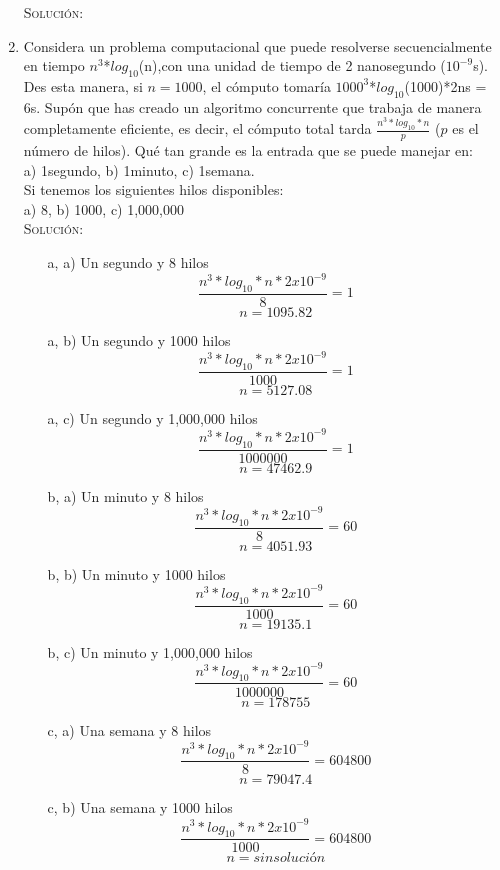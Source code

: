 \documentclass[letterpaper,10pt]{article}
\begin{document}
\begin{enumerate}
    \textsc{Solución:}
         \\
    
    \item Considera un problema computacional que puede resolverse secuencialmente en tiempo $n^3$*$log_{10}$(n),con una unidad de tiempo de 2 nanosegundo ($10^{-9}$s). Des esta manera, si $n = 1000$, el cómputo tomaría $1000^{3}$*$log_{10}$(1000)*2ns = 6s. Supón que has creado un algoritmo concurrente que trabaja de manera completamente eficiente, es decir, el cómputo total tarda $\frac{n^3*log_{10}*n}{p}$ ($p$ es el número de hilos). Qué tan grande es la entrada que se puede manejar en:\\
    a) 1segundo, b) 1minuto, c) 1semana.\\
    Si tenemos los siguientes hilos disponibles:\\
    a) 8, b) 1000, c) 1,000,000\\

    \textsc{Solución:}
	\\
	\begin{itemize}
	
	\item[a, a) ] Un segundo y 8 hilos\\
	$$\frac{n^3*log_{10}*n*2x10^{-9}}{8}=1$$
	$$n = 1095.82$$
	
	\item[a, b) ] Un segundo y 1000 hilos
	$$\frac{n^3*log_{10}*n*2x10^{-9}}{1000}=1$$
	$$n = 5127.08$$
	
	\item[a, c) ] Un segundo y 1,000,000 hilos
	$$\frac{n^3*log_{10}*n*2x10^{-9}}{1000000}=1$$
	$$n = 47462.9$$
	
	\item[b, a) ] Un minuto y 8 hilos
	$$\frac{n^3*log_{10}*n*2x10^{-9}}{8}=60$$
	$$n = 4051.93$$
	
	\item[b, b) ] Un minuto y 1000 hilos
	$$\frac{n^3*log_{10}*n*2x10^{-9}}{1000}=60$$
	$$n = 19135.1$$
	
	\item[b, c) ] Un minuto y 1,000,000 hilos
	$$\frac{n^3*log_{10}*n*2x10^{-9}}{1000000}=60$$
	$$n = 178755$$
	
	\item[c, a) ] Una semana y 8 hilos
	$$\frac{n^3*log_{10}*n*2x10^{-9}}{8}=604800$$
	$$n = 79047.4$$
	
	\item[c, b) ] Una semana y 1000 hilos
	$$\frac{n^3*log_{10}*n*2x10^{-9}}{1000}=604800$$
	$$n = sin solución$$
	

\end{itemize}
\end{enumerate}
\end{document}
